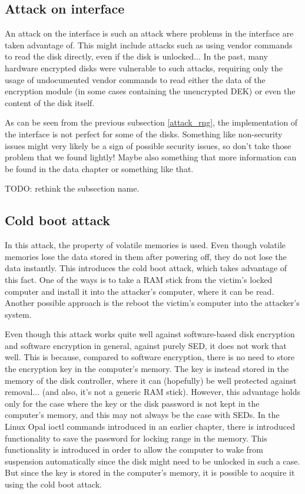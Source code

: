 \subsection{Attack on interface}

An attack on the interface is such an attack where problems in the interface are taken advantage of.
This might include attacks such as using vendor commands to read the disk directly, even if the disk is unlocked... In the past, many hardware encrypted disks were vulnerable to such attacks, requiring only the usage of undocumented vendor commands to read either the data of the encryption module (in some cases containing the unencrypted DEK) or even the content of the disk itself.

As can be seen from the previous subsection \ref{attack_rng}, the implementation of the interface is not perfect for some of the disks. Something like non-security issues might very likely be a sign of possible security issues, so don't take those problem that we found lightly! Maybe also something that more information can be found in the data chapter or something like that.

TODO: rethink the subsection name.

\subsection{Cold boot attack}

In this attack, the property of volatile memories is used. Even though volatile memories lose the data stored in them after powering off, they do not lose the data instantly. This introduces the cold boot attack, which takes advantage of this fact. One of the ways is to take a RAM stick from the victim's locked computer and install it into the attacker's computer, where it can be read. Another possible approach is the reboot the victim's computer into the attacker's system.

Even though this attack works quite well against software-based disk encryption and software encryption in general, against purely SED, it does not work that well. This is because, compared to software encryption, there is no need to store the encryption key in the computer's memory. The key is instead stored in the memory of the disk controller, where it can (hopefully) be well protected against removal... (and also, it's not a generic RAM stick). However, this advantage holds only for the case where the key or the disk password is not kept in the computer's memory, and this may not always be the case with SEDs. In the Linux Opal ioctl commands introduced in an earlier chapter, there is introduced functionality to save the password for locking range in the memory. This functionality is introduced in order to allow the computer to wake from suspension automatically since the disk might need to be unlocked in such a case. But since the key is stored in the computer's memory, it is possible to acquire it using the cold boot attack.

